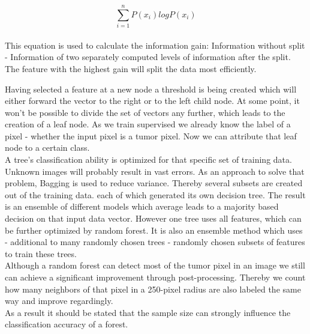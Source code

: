 \documentclass{article}
\begin{document}
  \[ \sum_{i=1}^n P(x_i) logP(x_i)\]\\

  This equation is used to calculate the information gain: Information without split - Information of two separately computed levels of information after the split. The feature with the highest gain will split the data most efficiently.

Having selected a feature at a new node a threshold is being created which will either forward the vector to the right or to the left child node. At some point, it won't be possible to divide the set of vectors any further, which leads to the creation of a leaf node. As we train supervised we already know the label of a pixel - whether the input pixel is a tumor pixel. Now we can attribute that leaf node to a certain class. \\


 A tree's classification ability is optimized for that specific set of training data. Unknown images will probably result in vast errors. As an approach to solve that problem, Bagging is used to reduce variance. Thereby several subsets are created out of the training data. each of which generated its own decision tree. The result is an ensemble of different models which average leads to a majority based decision on that input data vector. However one tree uses all features, which can be further optimized by random forest. It is also an ensemble method which uses - additional to many randomly chosen trees - randomly chosen subsets of features to train these trees. \\


 Although a random forest can detect most of the tumor pixel in an image we still can achieve a significant improvement through post-processing. Thereby we count how many neighbors of that pixel in a 250-pixel radius are also labeled the same way and improve regardingly. \\

 As a result it should be stated that the sample size can strongly influence the classification accuracy of a forest. 
 
\end{document}
